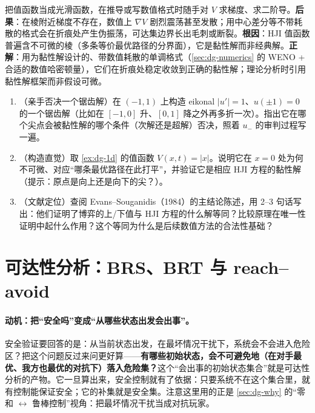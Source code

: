 \begin{pitfall}
把值函数当成光滑函数，在推导或写数值格式时随手对 $V$ 求梯度、求二阶导。\textbf{后果}：在棱附近梯度不存在，数值上 $\nabla V$ 剧烈震荡甚至发散；用中心差分等不带耗散的格式会在折痕处产生伪振荡，可达集边界长出毛刺或断裂。\textbf{根因}：HJI 值函数普遍含不可微的棱（多条等价最优路径的分界面），它是黏性解而非经典解。\textbf{正解}：用为黏性解设计的、带数值耗散的单调格式（\cref{sec:dg-numerics} 的 WENO + 合适的数值哈密顿量），它们在折痕处稳定收敛到正确的黏性解；理论分析时引用黏性解框架而非假设可微。
\end{pitfall}

\begin{practice}
\begin{enumerate}
  \item （亲手否决一个锯齿解）在 $(-1,1)$ 上构造 eikonal $|u'|=1$、$u(\pm1)=0$ 的一个锯齿解（比如在 $[-1,0]$ 升、$[0,1]$ 降之外再多折一次）。指出它在哪个尖点会被黏性解的哪个条件（次解还是超解）否决，照着 $u_-$ 的审判过程写一遍。
  \item （构造直觉）取 \cref{ex:dg-1d} 的值函数 $V(x,t)=|x|$。说明它在 $x=0$ 处为何不可微、对应“哪条最优路径在此打平”，并验证它是相应 HJI 方程的黏性解（提示：原点是向上还是向下的尖？）。
  \item （文献定位）查阅 Evans--Souganidis（1984）的主结论陈述，用 2--3 句话写出：他们证明了博弈的上/下值与 HJI 方程的什么解等同？比较原理在唯一性证明中起什么作用？这个等同为什么是后续数值方法的合法性基础？
\end{enumerate}
\end{practice}

\section{可达性分析：BRS、BRT 与 reach--avoid}
\label{sec:dg-reach}

\paragraph{动机：把“安全吗”变成“从哪些状态出发会出事”。}
安全验证要回答的是：从当前状态出发，在最坏情况干扰下，系统会不会进入危险区？把这个问题反过来问更好算——\textbf{有哪些初始状态，会不可避免地（在对手最优、我方也最优的对抗下）落入危险集？}这个“会出事的初始状态集合”就是可达性分析的产物。它一旦算出来，安全控制就有了依据：只要系统不在这个集合里，就有控制能保证安全；它的补集就是安全集。注意这里用的正是 \cref{sec:dg-why} 的“零和 $\leftrightarrow$ 鲁棒控制”视角：把最坏情况干扰当成对抗玩家。

